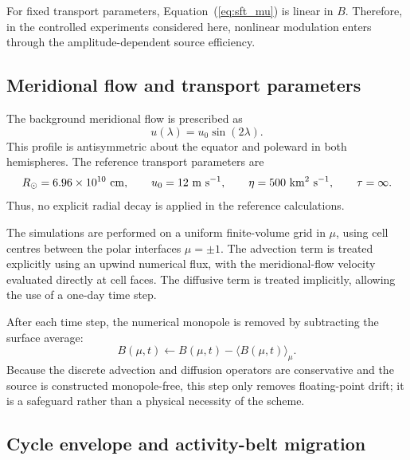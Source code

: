 \documentclass[namedreferences,hyperref,optionalrh,solaromanenum]{spr-sola}
\begin{document}
For fixed transport parameters, Equation~(\ref{eq:sft_mu}) is linear in
$B$. Therefore, in the controlled experiments considered here, nonlinear
modulation enters through the amplitude-dependent source efficiency.

\subsection{Meridional flow and transport parameters}
\label{subsec:transport_params}

The background meridional flow is prescribed as
%
\begin{equation}
u(\lambda)=u_0\sin(2\lambda).
\label{eq:meridional_flow}
\end{equation}
%
This profile is antisymmetric about the equator and poleward in both
hemispheres. The reference transport parameters are
%
\begin{equation}
R_\odot=6.96\times10^{10}~{\rm cm},
\qquad
u_0=12~{\rm m~s^{-1}},
\qquad
\eta=500~{\rm km^2~s^{-1}},
\qquad
\tau=\infty .
\label{eq:transport_params}
\end{equation}
%
Thus, no explicit radial decay is applied in the reference calculations.

The simulations are performed on a uniform finite-volume grid in $\mu$,
using cell centres between the polar interfaces $\mu=\pm1$. The advection
term is treated explicitly using an upwind numerical flux, with the
meridional-flow velocity evaluated directly at cell faces. The diffusive
term is treated implicitly, allowing the use of a one-day time step.

After each time step, the numerical monopole is removed by subtracting the
surface average:
%
\begin{equation}
B(\mu,t)
\leftarrow
B(\mu,t)
-
\langle B(\mu,t)\rangle_{\mu}.
\label{eq:monopole_removal}
\end{equation}
%
Because the discrete advection and diffusion operators are conservative
and the source is constructed monopole-free, this step only removes
floating-point drift; it is a safeguard rather than a physical necessity
of the scheme.

\subsection{Cycle envelope and activity-belt migration}
\label{subsec:cycle_envelope}
\end{document}
